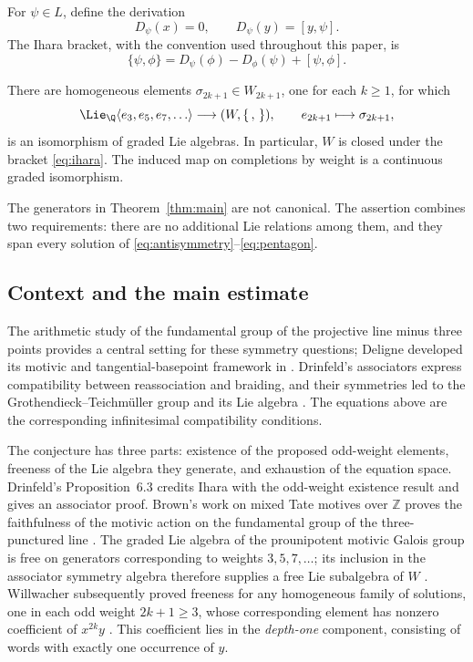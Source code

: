 For \(\psi\in L\), define the derivation
\begin{equation}\label{eq:ihara-derivation}
 D_\psi(x)=0,\qquad D_\psi(y)=[y,\psi].
\end{equation}
The Ihara bracket, with the convention used throughout this paper, is
\begin{equation}\label{eq:ihara}
 \{\psi,\phi\}=D_\psi(\phi)-D_\phi(\psi)+[\psi,\phi].
\end{equation}

\begin{theorem}\label{thm:main}
There are homogeneous elements
\(\sigma_{2k+1}\in W_{2k+1}\), one for each \(k\ge1\), for which
\[
 \Lie_{\Q}\langle e_3,e_5,e_7,\ldots\rangle
 \longrightarrow (W,\{\, ,\,\}),\qquad
 e_{2k+1}\longmapsto\sigma_{2k+1},
\]
is an isomorphism of graded Lie algebras.
In particular, \(W\) is closed under the bracket
\eqref{eq:ihara}.  The induced map on completions by weight is a
continuous graded isomorphism.
\end{theorem}

The generators in Theorem~\ref{thm:main} are not canonical.
The assertion combines two requirements: there are no additional Lie
relations among them, and they span every solution of
\eqref{eq:antisymmetry}--\eqref{eq:pentagon}.

\subsection{Context and the main estimate}
The arithmetic study of the fundamental group of the projective line
minus three points provides a central setting for these symmetry
questions; Deligne developed its motivic and tangential-basepoint
framework in \cite[Introduction and Section~15]{Deligne}.
Drinfeld's associators express compatibility between reassociation and
braiding, and their symmetries led to the
Grothendieck--Teichm\"uller group and its Lie algebra
\cite{Drinfeld}.  The equations above are the corresponding
infinitesimal compatibility conditions.

The conjecture has three parts: existence of the proposed odd-weight
elements, freeness of the Lie algebra they generate, and exhaustion of
the equation space.  Drinfeld's Proposition~6.3 credits Ihara with the
odd-weight existence result and gives an associator proof.
Brown's work on mixed Tate motives over \(\mathbb Z\) proves the
faithfulness of the motivic action on the fundamental group of the
three-punctured line \cite{Brown}.  The graded Lie algebra of the
prounipotent motivic Galois group is free on generators corresponding to weights
\(3,5,7,\ldots\); its inclusion in the associator symmetry algebra
therefore supplies a free Lie subalgebra of \(W\)
\cite[Section~1.4.2]{BrownDepth}.
Willwacher subsequently proved freeness for any homogeneous family of
solutions, one in each odd weight \(2k+1\ge3\), whose corresponding
element has nonzero coefficient of
\(x^{2k}y\) \cite[Theorem~1.2]{WillwacherFree}.
This coefficient lies in the \emph{depth-one} component, consisting of
words with exactly one occurrence of \(y\).

